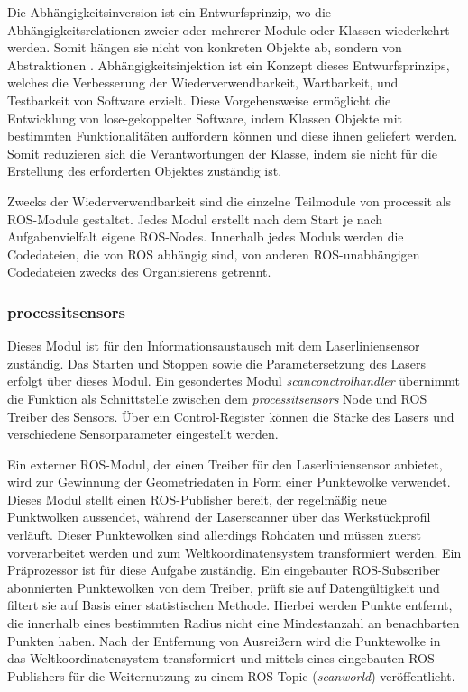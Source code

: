 Die Abhängigkeitsinversion ist ein Entwurfsprinzip, wo die Abhängigkeitsrelationen zweier oder mehrerer Module oder Klassen wiederkehrt werden. Somit hängen sie nicht von konkreten Objekte ab, sondern von Abstraktionen  \autocite[67]{Noback2018}. Abhängigkeitsinjektion ist ein Konzept dieses Entwurfsprinzips, welches die Verbesserung der Wiederverwendbarkeit, Wartbarkeit, und Testbarkeit von Software erzielt. Diese Vorgehensweise ermöglicht die Entwicklung von lose-gekoppelter Software, indem Klassen Objekte mit bestimmten Funktionalitäten auffordern können und diese ihnen geliefert werden. Somit reduzieren sich die Verantwortungen der Klasse, indem sie nicht für die Erstellung des erforderten Objektes zuständig ist. \autocite[204-1112]{Gregoire2021}

Zwecks der Wiederverwendbarkeit sind die einzelne Teilmodule von processit als ROS-Module gestaltet. Jedes Modul erstellt nach dem Start je nach Aufgabenvielfalt eigene ROS-Nodes. Innerhalb jedes Moduls werden die Codedateien, die von ROS abhängig sind, von anderen ROS-unabhängigen Codedateien zwecks des Organisierens getrennt.

\subsubsection{processit\textunderscore sensors}
Dieses Modul ist für den Informationsaustausch mit dem Laserliniensensor zuständig. Das Starten und Stoppen sowie die Parametersetzung des Lasers erfolgt über dieses Modul. Ein gesondertes Modul \emph{scanconctrol\textunderscore handler} übernimmt die Funktion als Schnittstelle zwischen dem \emph{processit\textunderscore sensors} Node und ROS Treiber des Sensors. Über ein Control-Register können die Stärke des Lasers und verschiedene Sensorparameter eingestellt werden.

Ein externer ROS-Modul, der einen Treiber für den Laserliniensensor anbietet, wird zur Gewinnung der Geometriedaten in Form einer Punktewolke verwendet. Dieses Modul stellt einen ROS-Publisher bereit, der regelmäßig neue Punktwolken aussendet, während der Laserscanner über das Werkstückprofil verläuft. Dieser Punktewolken sind allerdings Rohdaten und müssen zuerst vorverarbeitet werden und zum Weltkoordinatensystem transformiert werden. Ein Präprozessor ist für diese Aufgabe zuständig. Ein eingebauter ROS-Subscriber abonnierten Punktewolken von dem Treiber, prüft sie auf Datengültigkeit und filtert sie auf Basis einer statistischen Methode. Hierbei werden Punkte entfernt, die innerhalb eines bestimmten Radius nicht eine Mindestanzahl an benachbarten Punkten haben. Nach der Entfernung von Ausreißern wird die Punktewolke in das Weltkoordinatensystem transformiert und mittels eines eingebauten ROS-Publishers für die Weiternutzung zu einem ROS-Topic (\emph{scan\textunderscore world}) veröffentlicht.  

